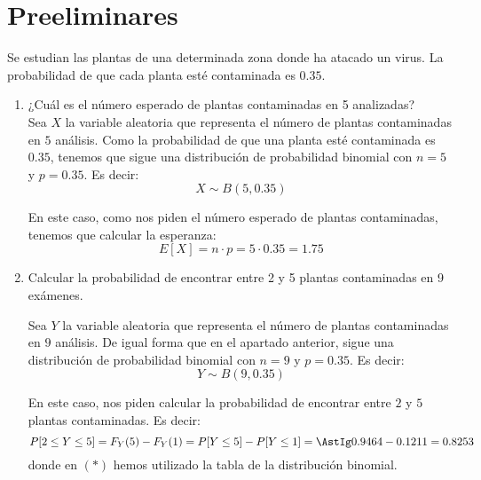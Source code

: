 \setcounter{section}{-1}
\section{Preeliminares}

\begin{ejercicio}
    Se estudian las plantas de una determinada zona donde ha atacado un virus. La probabilidad de
    que cada planta esté contaminada es $0.35$.
    \begin{enumerate}
        \item ¿Cuál es el número esperado de plantas contaminadas en 5 analizadas?\\
        Sea $X$ la variable aleatoria que representa el número de plantas contaminadas en $5$ análisis.
        Como la probabilidad de que una planta esté contaminada es $0.35$, tenemos que sigue una distribución de probabilidad binomial con $n=5$ y $p=0.35$. Es decir:
        \begin{equation*}
            X \sim B(5,0.35)
        \end{equation*}

        En este caso, como nos piden el número esperado de plantas contaminadas, tenemos que calcular la esperanza:
        \begin{equation*}
            E[X] = n \cdot p = 5 \cdot 0.35 = 1.75
        \end{equation*}

        \item Calcular la probabilidad de encontrar entre 2 y 5 plantas contaminadas en 9 exámenes.
        
        Sea $Y$ la variable aleatoria que representa el número de plantas contaminadas en $9$ análisis.
        De igual forma que en el apartado anterior, sigue una distribución de probabilidad binomial con $n=9$ y $p=0.35$. Es decir:
        \begin{equation*}
            Y \sim B(9,0.35)
        \end{equation*}

        En este caso, nos piden calcular la probabilidad de encontrar entre $2$ y $5$ plantas contaminadas. Es decir:
        \begin{equation*}
            P[2 \leq Y \leq 5] = F_Y(5) - F_Y(1) = P[Y\leq 5] - P[Y\leq 1] = \AstIg 0.9464 - 0.1211 = 0.8253
        \end{equation*}
        donde en $(\ast)$ hemos utilizado la tabla de la distribución binomial.


\end{enumerate}
\end{ejercicio}
